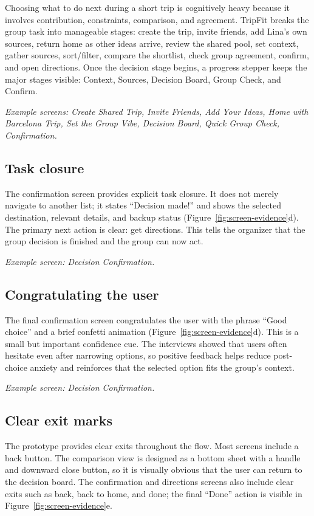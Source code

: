\documentclass[11pt,a4paper]{article}
\begin{document}
Choosing what to do next during a short trip is cognitively heavy because it involves contribution, constraints, comparison, and agreement. TripFit breaks the group task into manageable stages: create the trip, invite friends, add Lina's own sources, return home as other ideas arrive, review the shared pool, set context, gather sources, sort/filter, compare the shortlist, check group agreement, confirm, and open directions. Once the decision stage begins, a progress stepper keeps the major stages visible: Context, Sources, Decision Board, Group Check, and Confirm.

\textit{Example screens: Create Shared Trip, Invite Friends, Add Your Ideas, Home with Barcelona Trip, Set the Group Vibe, Decision Board, Quick Group Check, Confirmation.}

\subsection{Task closure}

The confirmation screen provides explicit task closure. It does not merely navigate to another list; it states ``Decision made!'' and shows the selected destination, relevant details, and backup status (Figure~\ref{fig:screen-evidence}d). The primary next action is clear: get directions. This tells the organizer that the group decision is finished and the group can now act.

\textit{Example screen: Decision Confirmation.}

\subsection{Congratulating the user}

The final confirmation screen congratulates the user with the phrase ``Good choice'' and a brief confetti animation (Figure~\ref{fig:screen-evidence}d). This is a small but important confidence cue. The interviews showed that users often hesitate even after narrowing options, so positive feedback helps reduce post-choice anxiety and reinforces that the selected option fits the group's context.

\textit{Example screen: Decision Confirmation.}

\subsection{Clear exit marks}

The prototype provides clear exits throughout the flow. Most screens include a back button. The comparison view is designed as a bottom sheet with a handle and downward close button, so it is visually obvious that the user can return to the decision board. The confirmation and directions screens also include clear exits such as back, back to home, and done; the final ``Done'' action is visible in Figure~\ref{fig:screen-evidence}e.
\end{document}
